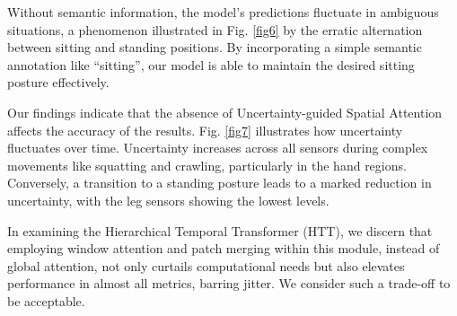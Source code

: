 \documentclass[letterpaper]{article} %
\begin{document}
Without semantic information, the model's predictions fluctuate in ambiguous situations, a phenomenon illustrated in Fig. \ref{fig6} by the erratic alternation between sitting and standing positions. By incorporating a simple semantic annotation like ``sitting'', our model is able to maintain the desired sitting posture effectively.


Our findings indicate that the absence of Uncertainty-guided Spatial Attention affects the accuracy of the results. Fig. \ref{fig7} illustrates how uncertainty fluctuates over time. Uncertainty increases across all sensors during complex movements like squatting and crawling, particularly in the hand regions. Conversely, a transition to a standing posture leads to a marked reduction in uncertainty, with the leg sensors showing the lowest levels.

In examining the Hierarchical Temporal Transformer (HTT), we discern that employing window attention and patch merging within this module, instead of global attention, not only curtails computational needs but also elevates performance in almost all metrics, barring jitter. We consider such a trade-off to be acceptable.
\end{document}
